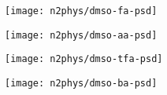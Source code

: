 \begin{figure}[!htb]
    \begin{subfigure}{0.25\linewidth}
        \texttt{[image: n2phys/dmso-fa-psd]}%
        \label{appx:def:fgr:psd-dmso-fa}
    \end{subfigure}%
    \begin{subfigure}{0.25\linewidth}
        \texttt{[image: n2phys/dmso-aa-psd]}%
        \label{appx:def:fgr:psd-dmso-aa}
    \end{subfigure}%
    \begin{subfigure}{0.25\linewidth}
        \texttt{[image: n2phys/dmso-tfa-psd]}%
        \label{appx:def:fgr:psd-dmso-tfa}
    \end{subfigure}%
    \begin{subfigure}{0.25\linewidth}
        \texttt{[image: n2phys/dmso-ba-psd]}%
        \label{appx:def:fgr:psd-dmso-ba}
    \end{subfigure}%

\end{figure}
